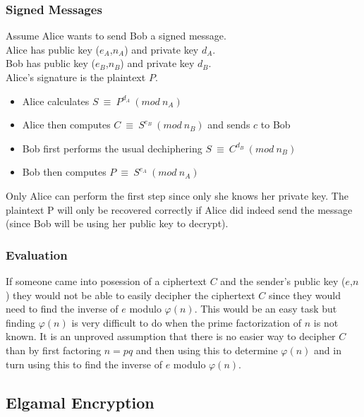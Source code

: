 \documentclass{article}
\begin{document}
	\subsubsection{Signed Messages}
	Assume Alice wants to send Bob a signed message.\\
	Alice has public key ($e_A$,$n_A$) and private key $d_A$.\\
	Bob has public key ($e_B$,$n_B$) and private key $d_B$.\\
	Alice's signature is the plaintext $P$.\\
	\begin{itemize}
		\item Alice calculates $S~\equiv~P^{d_A}~(mod~n_A)$
		\item Alice then computes $C~\equiv~S^{e_B}~(mod~n_B)$ and sends $c$ to Bob
		\item Bob first performs the usual dechiphering $S~\equiv~C^{d_B}~(mod~n_B)$
		\item Bob then computes $P~\equiv~S^{e_A}~(mod~n_A)$
	\end{itemize}
	Only Alice can perform the first step since only she knows her private key. The plaintext P will only be recovered correctly if Alice did indeed send the message (since Bob will be using her public key to decrypt).

	
	\subsubsection{Evaluation}
	If someone came into posession of a ciphertext $C$ and the sender's public key ($e$,$n$) they would not be able to easily decipher the ciphertext $C$ since they would need to find the inverse of $e$ modulo $\varphi(n)$. This would be an easy task but finding $\varphi(n)$ is very difficult to do when the prime factorization of $n$ is not known. It is an unproved assumption that there is no easier way to decipher $C$ than by first factoring $n=pq$ and then using this to determine $\varphi(n)$ and in turn using this to find the inverse of $e$ modulo $\varphi(n)$.
	
\subsection{Elgamal Encryption}
\end{document}
